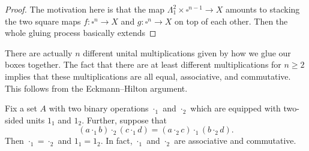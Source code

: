 \documentclass[../notes.tex]{subfiles}
\begin{document}
\begin{proof}
	The motivation here is that the map $\Lambda_1^2\times\square^{n-1}\to X$ amounts to stacking the two square maps $f\colon\square^n\to X$ and $g\colon\square^n\to X$ on top of each other. Then the whole gluing process basically extends 
\end{proof}
There are actually $n$ different unital multiplications given by how we glue our boxes together. The fact that there are at least different multiplications for $n\ge2$ implies that these multiplications are all equal, associative, and commutative. This follows from the Eckmann--Hilton argument.
\begin{lemma} \label{lem:eh}
	Fix a set $A$ with two binary operations $\cdot_1$ and $\cdot_2$ which are equipped with two-sided units $1_1$ and $1_2$. Further, suppose that
	\[(a\cdot_1b)\cdot_2(c\cdot_1d)=(a\cdot_2c)\cdot_1(b\cdot_2d).\]
	Then ${\cdot_1}={\cdot_2}$ and $1_1=1_2$. In fact, $\cdot_1$ and $\cdot_2$ are associative and commutative.
\end{lemma}
\end{document}

